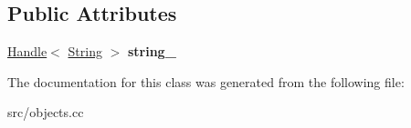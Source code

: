 \subsection*{Public Attributes}
\begin{DoxyCompactItemize}
\item 
\hypertarget{classv8_1_1internal_1_1_internalized_string_key_a2a11ac2998b5260e60c74354f8f3a9f5}{}\hyperlink{classv8_1_1internal_1_1_handle}{Handle}$<$ \hyperlink{classv8_1_1internal_1_1_string}{String} $>$ {\bfseries string\+\_\+}\label{classv8_1_1internal_1_1_internalized_string_key_a2a11ac2998b5260e60c74354f8f3a9f5}

\end{DoxyCompactItemize}


The documentation for this class was generated from the following file\+:\begin{DoxyCompactItemize}
\item 
src/objects.\+cc\end{DoxyCompactItemize}
